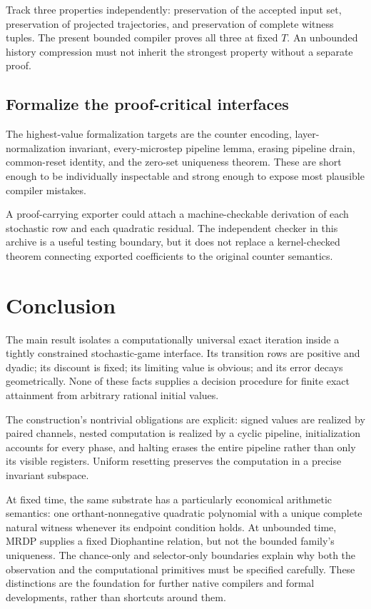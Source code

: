 \documentclass[11pt,letterpaper]{article}
\theoremstyle{definition}
\theoremstyle{remark}
\begin{document}
Track three properties independently: preservation of the accepted input
set, preservation of projected trajectories, and preservation of complete
witness tuples. The present bounded compiler proves all three at fixed
$T$. An unbounded history compression must not inherit the strongest
property without a separate proof.

\subsection{Formalize the proof-critical interfaces}\label{ste:ec:q:formalize}

The highest-value formalization targets are the counter encoding,
layer-normalization invariant, every-microstep pipeline lemma, erasing
pipeline drain, common-reset identity, and the zero-set uniqueness theorem.
These are short enough to be individually inspectable and strong enough
to expose most plausible compiler mistakes.

A proof-carrying exporter could attach a machine-checkable derivation of
each stochastic row and each quadratic residual. The independent checker
in this archive is a useful testing boundary, but it does not replace a
kernel-checked theorem connecting exported coefficients to the original
counter semantics.

\section{Conclusion}

The main result isolates a computationally universal exact iteration
inside a tightly constrained stochastic-game interface. Its transition
rows are positive and dyadic; its discount is fixed; its limiting value
is obvious; and its error decays geometrically. None of these facts
supplies a decision procedure for finite exact attainment from arbitrary
rational initial values.

The construction's nontrivial obligations are explicit: signed values are
realized by paired channels, nested computation is realized by a cyclic
pipeline, initialization accounts for every phase, and halting erases the
entire pipeline rather than only its visible registers. Uniform resetting
preserves the computation in a precise invariant subspace.

At fixed time, the same substrate has a particularly economical arithmetic
semantics: one orthant-nonnegative quadratic polynomial with a unique
complete natural witness whenever its endpoint condition holds. At
unbounded time, MRDP supplies a fixed Diophantine relation, but not the
bounded family's uniqueness. The chance-only and selector-only boundaries
explain why both the observation and the computational primitives must be
specified carefully. These distinctions are the foundation for further
native compilers and formal developments, rather than shortcuts around
them.
\end{document}

